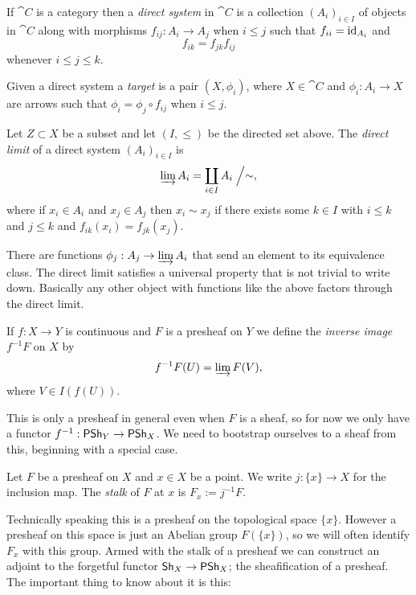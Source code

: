 If $\cat C$ is a category then a \emph{direct system} in $\cat C$ is a collection $(A_i)_{i \in I}$ of objects in $\cat C$ along with morphisms $f_{ij} : A_i \to A_j$ when $i \leq j$ such that $f_{ii} = \operatorname{id}_{A_i}$ and
\[
f_{ik} = f_{jk} f_{ij}
\]
whenever $i \leq j \leq k$.

Given a direct system a \emph{target} is a pair $(X, \phi_i)$, where $X \in \cat C$ and $\phi_i : A_i \to X$ are arrows such that $\phi_i = \phi_j \circ f_{ij}$ when $i \leq j$.


\begin{defi}
Let $Z \subset X$ be a subset and let $(I, \leq)$ be the directed set above.
The \emph{direct limit} of a direct system $(A_i)_{i \in I}$ is
\[
\varinjlim A_i
= \coprod_{i \in I} A_i \Bigm/ \sim, 
\]
where if $x_i \in A_i$ and $x_j \in A_j$ then $x_i \sim x_j$ if there exists some $k \in I$ with $i \leq k$ and $j \leq k$ and $f_{ik}(x_i) = f_{jk}(x_j)$.
\end{defi}

There are functions $\phi_j : A_j \to \varinjlim A_i$ that send an element to its equivalence class.
The direct limit satisfies a universal property that is not trivial to write down.
Basically any other object with functions like the above factors through the direct limit.


\begin{defi}
If $f : X \to Y$ is continuous and $F$ is a presheaf on $Y$ we define the \emph{inverse image} $f^{-1}F$ on $X$ by
\[
f^{-1}F(U)
= \varinjlim F(V),
\]
where $V \in I(f(U))$.
\end{defi}

This is only a presheaf in general even when $F$ is a sheaf, so for now we only have a functor $f^{-1} : \mathsf{PSh}_Y \to \mathsf{PSh}_X$.
We need to bootstrap ourselves to a sheaf from this, beginning with a special case.


\begin{defi}
Let $F$ be a presheaf on $X$ and $x \in X$ be a point.
We write $j : \{x\} \to X$ for the inclusion map.
The \emph{stalk} of $F$ at $x$ is $F_x := j^{-1}F$.
\end{defi}

Technically speaking this is a presheaf on the topological space $\{x\}$.
However a presheaf on this space is just an Abelian group $F(\{x\})$, so we will often identify $F_x$ with this group.
Armed with the stalk of a presheaf we can construct an adjoint to the forgetful functor $\mathsf{Sh}_X \to \mathsf{PSh}_X$; the sheafification of a presheaf.
The important thing to know about it is this:


